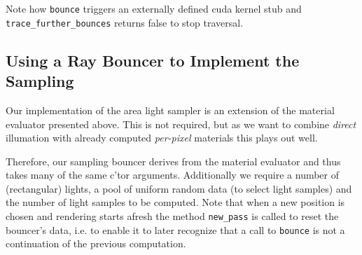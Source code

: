 \documentclass[a4paper,11pt]{scrartcl}
\begin{document}
Note how \lstinline|bounce| triggers an externally defined cuda kernel stub and \lstinline|trace_further_bounces| returns false to stop traversal.



\subsection{Using a Ray Bouncer to Implement the Sampling}
Our implementation of the area light sampler is an extension of the material evaluator presented above.
This is not required, but as we want to combine \emph{direct} illumation with already computed \emph{per-pixel} materials this plays out well.

Therefore, our sampling bouncer derives from the material evaluator and thus takes many of the same c'tor arguments.
Additionally we require a number of (rectangular) lights, a pool of uniform random data (to select light samples) and 
	the number of light samples to be computed.
Note that when a new position is chosen and rendering starts afresh the method \lstinline|new_pass| is called to reset the bouncer's data, 
	i.e. to enable it to later recognize that a call to \lstinline|bounce| is not a continuation of the previous computation.
\end{document}
